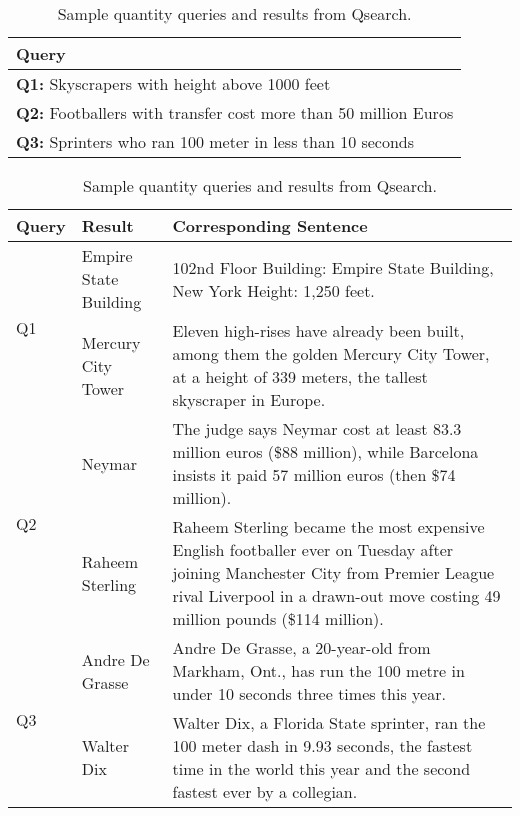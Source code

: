 \begin{table}[t]
	\caption{Sample quantity queries and results from Qsearch.}	
	\small	
	\begin{tabular}{p{}} \hline
Query \\ \hline
\textbf{Q1:} Skyscrapers with height above 1000 feet\\ 
\textbf{Q2:} Footballers with transfer cost more than 50 million Euros \\  
\textbf{Q3:} Sprinters who ran 100 meter in less than 10 seconds  \\  
	\end{tabular}
	\small
	\begin{tabular}{l| p{} p{}} 
	 \hline
		Query & Result & Corresponding Sentence \\ \hline
		\multirow{2}{*}{Q1}& Empire State Building & 102nd Floor Building: Empire State Building, New York Height: 1,250 feet.\\ 	\cline{2-3}	
		& Mercury City Tower & 	Eleven high-rises have already been built, among them the golden Mercury City Tower, at a height of 339 meters, the tallest skyscraper in Europe.\\ 
		\hline
		\multirow{2}{*}{Q2} & Neymar & The judge says Neymar cost at least 83.3 million euros (\$88 million), while Barcelona insists it paid 57 million euros (then \$74 million). \\ 	\cline{2-3}
		& Raheem Sterling & 	Raheem Sterling became the most expensive English footballer ever on Tuesday after joining Manchester City from Premier League rival Liverpool in a drawn-out move costing 49 million pounds (\$114 million).\\ 
		\hline
		
		\multirow{2}{*}{Q3} & Andre De Grasse & Andre De Grasse, a 20-year-old from Markham, Ont., has run the 100 metre in under 10 seconds three times this year. \\ 	\cline{2-3}
		& Walter Dix & 		Walter Dix, a Florida State sprinter, ran the 100 meter dash in 9.93 seconds, the fastest time in the world this year and the second fastest ever by a collegian.\\ 
		\hline

		
	\end{tabular}	
	\label{table:sample_q}
	\vspace{-1em}
\end{table}